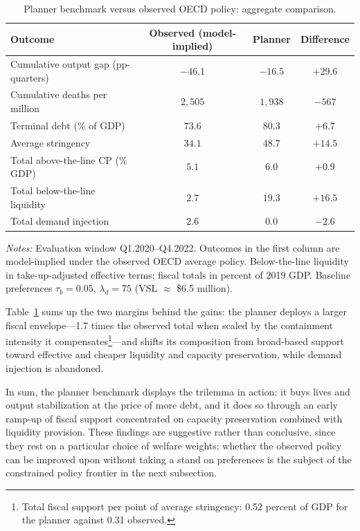 \documentclass[12pt, a4paper]{article}
\begin{document}
\begin{table}[H]
\centering
\scriptsize
\caption{Planner benchmark versus observed OECD policy: aggregate comparison.}
\label{tab:planner_summary}
\begin{tabular}{lccc}
\toprule
\textbf{Outcome} & \textbf{Observed (model-implied)} & \textbf{Planner} & \textbf{Difference} \\
\midrule
Cumulative output gap (pp-quarters) & $-46.1$ & $-16.5$ & $+29.6$ \\
Cumulative deaths per million       & $2{,}505$ & $1{,}938$ & $-567$ \\
Terminal debt (\% of GDP)           & $73.6$  & $80.3$  & $+6.7$ \\
Average stringency                  & $34.1$  & $48.7$  & $+14.5$ \\
Total above-the-line CP (\% GDP)    & $5.1$   & $6.0$   & $+0.9$ \\
Total below-the-line liquidity      & $2.7$   & $19.3$  & $+16.5$ \\
Total demand injection              & $2.6$   & $0.0$   & $-2.6$ \\
\bottomrule
\end{tabular}
\vspace{0.15cm}
\begin{minipage}{0.95\textwidth}
\scriptsize \textit{Notes:} Evaluation window Q1.2020--Q4.2022. Outcomes in the
first column are model-implied under the observed OECD average policy.
Below-the-line liquidity in take-up-adjusted effective terms; fiscal totals in
percent of 2019 GDP. Baseline preferences \(\tau_b = 0.05\), \(\lambda_d = 75\)
(VSL \(\approx\) \$6.5 million).
\end{minipage}
\end{table}


\noindent Table~\ref{tab:planner_summary} sums up the two margins behind the gains: the planner deploys a larger fiscal envelope---1.7 times the observed total when scaled by the containment intensity it compensates\footnote{Total fiscal support per point of average stringency: 0.52 percent of GDP for the planner against 0.31 observed.}---and shifts its composition from broad-based support toward effective and cheaper liquidity and capacity preservation, while demand injection is abandoned.


In sum, the planner benchmark displays the trilemma in action: it buys lives and output stabilization at the price of more debt, and it does so through an early ramp-up of fiscal support concentrated on capacity preservation combined
with liquidity provision. These findings are suggestive rather than conclusive, since they rest on a particular choice of welfare weights; whether the observed policy can be improved upon without taking a stand on preferences is the subject of the constrained policy frontier in the next subsection.
\end{document}
